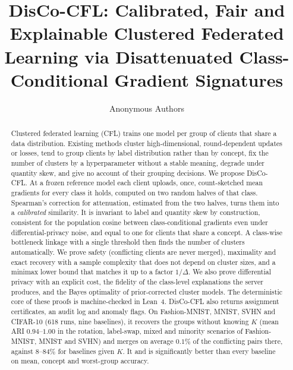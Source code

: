 \documentclass[journal]{IEEEtran}
\theoremstyle{definition}
\begin{document}
\title{DisCo-CFL: Calibrated, Fair and Explainable Clustered Federated Learning via Disattenuated Class-Conditional Gradient Signatures}
\author{Anonymous Authors}
\maketitle

\begin{abstract}
Clustered federated learning (CFL) trains one model per group of clients that share a data distribution. Existing methods cluster high-dimensional, round-dependent updates or losses, tend to group clients by label distribution rather than by concept, fix the number of clusters by a hyperparameter without a stable meaning, degrade under quantity skew, and give no account of their grouping decisions. We propose DisCo-CFL. At a frozen reference model each client uploads, once, count-sketched mean gradients for every class it holds, computed on two random halves of that class. Spearman's correction for attenuation, estimated from the two halves, turns them into a \emph{calibrated} similarity. It is invariant to label and quantity skew by construction, consistent for the population cosine between class-conditional gradients even under differential-privacy noise, and equal to one for clients that share a concept. A class-wise bottleneck linkage with a single threshold then finds the number of clusters automatically. We prove safety (conflicting clients are never merged), maximality and exact recovery with a sample complexity that does not depend on cluster sizes, and a minimax lower bound that matches it up to a factor $1/\Delta$. We also prove differential privacy with an explicit cost, the fidelity of the class-level explanations the server produces, and the Bayes optimality of prior-corrected cluster models. The deterministic core of these proofs is machine-checked in Lean~4. DisCo-CFL also returns assignment certificates, an audit log and anomaly flags. On Fashion-MNIST, MNIST, SVHN and CIFAR-10 (618 runs, nine baselines), it recovers the groups without knowing $K$ (mean ARI $0.94$--$1.00$ in the rotation, label-swap, mixed and minority scenarios of Fashion-MNIST, MNIST and SVHN) and merges on average $0.1\%$ of the conflicting pairs there, against 8--84\% for baselines given $K$. It and is significantly better than every baseline on mean, concept and worst-group accuracy.
\end{abstract}
\end{document}
